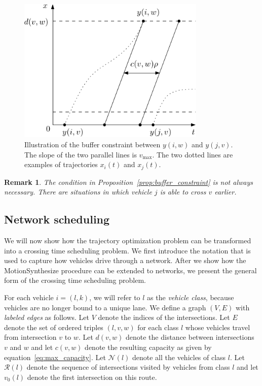 \documentclass[a4paper]{article}
\theoremstyle{definition}
\theoremstyle{plain}
\newtheorem{remark}{Remark}
\begin{document}
\begin{figure}[h]
  \centering
  \includegraphics[width=0.8\textwidth]{figures/capacity_constraint.pdf}
  \caption{Illustration of the buffer constraint between $y(i, w)$ and
    $y(j, v)$. The slope of the two parallel lines is $v_{\max}$. The two dotted
    lines are examples of trajectories $x_{i}(t)$ and $x_{j}(t)$.}\label{fig:constraint}
\end{figure}

\begin{remark}
  The condition in Proposition~\ref{prop:buffer_constraint} is not always necessary. There are situations
  in which vehicle $j$ is able to cross $v$ earlier.
\end{remark}


\subsection*{Network scheduling}

We will now show how the trajectory optimization problem can be transformed into
a crossing time scheduling problem. We first introduce the notation that is used
to capture how vehicles drive through a network. After we show how the
MotionSynthesize procedure can be extended to networks, we present the general
form of the crossing time scheduling problem.

For each vehicle $i = (l,k)$, we will refer to $l$ as the \textit{vehicle
  class}, because vehicles are no longer bound to a unique lane.
%
We define a graph $(V,E)$ with \textit{labeled edges} as follows. Let $V$ denote
the indices of the intersections. Let $E$ denote the set of ordered triples
$(l, v, w)$ for each class $l$ whose vehicles travel from intersection $v$ to
$w$.
%
Let $d(v, w)$ denote the distance between intersections $v$ and $w$ and let
$c(v, w)$ denote the resulting capacity as given by
equation~\eqref{eq:max_capacity}. Let $\mathcal{N}(l)$ denote all the vehicles
of class $l$. Let $\mathcal{R}(l)$ denote the sequence of intersections visited
by vehicles from class $l$ and let $v_{0}(l)$ denote the first intersection on
this route.
\end{document}
